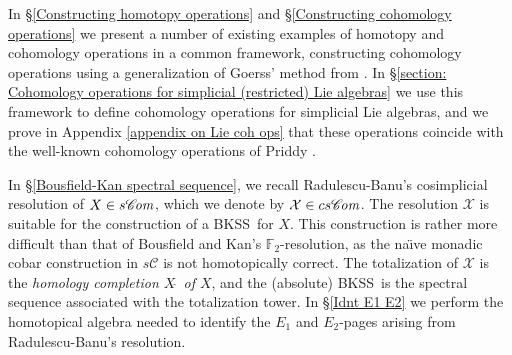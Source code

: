\documentclass[11pt]{amsart} \renewcommand{\baselinestretch}{1.2}
\theoremstyle{plain}
\numberwithin{equation}{section} %
\theoremstyle{plain}
\numberwithin{equation}{chapter} %
\newcommand{\scrC}{\mathscr{C}}
\newcommand{\calx}{\mathcal{X}}
\newcommand{\calc}{\mathcal{C}}
\newcommand{\F}{\mathbb{F}}
\newcommand{\algs}{{\scrC\!\textit{\normalfont\textit{om}}}}
\newcommand{\Ftwo}{\F_2}
\newcommand{\BKSS}{BKSS}
\begin{document}
\begin{Introduction}
In \S\ref{Constructing homotopy operations} and \S\ref{Constructing cohomology operations} we present a number of existing examples of homotopy and cohomology operations in a common framework, constructing cohomology operations using a generalization of Goerss' method from \cite{MR1089001}. In \S\ref{section: Cohomology operations for simplicial (restricted) Lie algebras} we use this framework  to define cohomology operations for simplicial Lie algebras, and we prove in Appendix \ref{appendix on Lie coh ops} that these operations coincide with the well-known cohomology operations of Priddy \cite{PriddySimplicialLie.pdf}. 




In \S\ref{Bousfield-Kan spectral sequence}, we recall Radulescu-Banu's \cite{Radulescu-Banu.pdf} cosimplicial resolution of $X\in s\algs$, which we denote by $\calx\in cs\algs$.
The resolution $\calx$ is suitable for the construction of a \BKSS\ for $X$. This construction is rather more difficult than that of Bousfield and Kan's $\Ftwo$-resolution, as the na\"{\i}ve monadic cobar construction in $s\calc$ is not homotopically correct.
The totalization of $\calx$ is the  \emph{homology completion $X\hat{\ }$ of $X$}, and the (absolute) \BKSS\ is the spectral sequence associated with the totalization tower. In  \S\ref{Idnt E1 E2} we perform the homotopical algebra needed to identify the $E_1$ and $E_2$-pages arising from Radulescu-Banu's resolution.
%
%






%
%


\end{Introduction}
\end{document}
